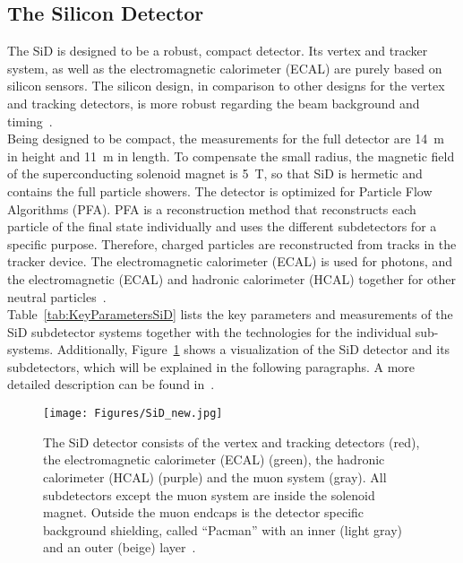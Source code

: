 \subsection{The Silicon Detector}
The SiD is designed to be a robust, compact detector.
Its vertex and tracker system, as well as the electromagnetic calorimeter (ECAL) are purely based on silicon sensors.
The silicon design, in comparison to other designs for the vertex and tracking detectors, is more robust regarding the beam background and timing~\cite[cf. p. 57ff]{TDR4}.
\\Being designed to be compact, the measurements for the full detector are \SI{14}{m} in height and \SI{11}{m} in length.
To compensate the small radius, the magnetic field of the superconducting solenoid magnet is \SI{5}{T}, so that SiD is hermetic and contains the full particle showers.
The detector is optimized for Particle Flow Algorithms (PFA).
PFA is a reconstruction method that reconstructs each particle of the final state individually and uses the different subdetectors for a specific purpose.
Therefore, charged particles are reconstructed from tracks in the tracker device.
The electromagnetic calorimeter (ECAL) is used for photons, and the electromagnetic (ECAL) and hadronic calorimeter (HCAL) together for other neutral particles~\cite{PFA}.
\\Table~\ref{tab:KeyParametersSiD} lists the key parameters and measurements of the SiD subdetector systems together with the technologies for the individual sub-systems.
Additionally, Figure~\ref{fig:SiD} shows a visualization of the SiD detector and its subdetectors, which will be explained in the following paragraphs.
A more detailed description can be found in~\cite{TDR4}.
\begin{figure}[h]
\centering
\texttt{[image: Figures/SiD\_new.jpg]}
\caption[Visualization of the SiD detector]{The SiD detector consists of the vertex and tracking detectors (red), the electromagnetic calorimeter (ECAL) (green), the hadronic calorimeter (HCAL) (purple) and the muon system (gray).
All subdetectors except the muon system are inside the solenoid magnet.
Outside the muon endcaps is the detector specific background shielding, called ``Pacman'' with an inner (light gray) and an outer (beige) layer~\cite{SiD_Geo}.}
\label{fig:SiD}
\end{figure}

